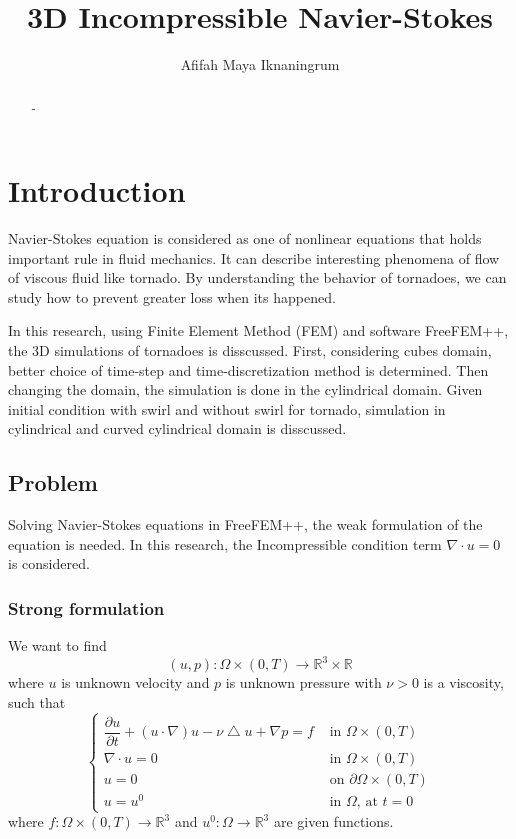 \documentclass[a4paper]{article}
\title{3D Incompressible Navier-Stokes}
\author{Afifah Maya Iknaningrum}
\newcommand{\R}{\mathbb{R}}
\begin{document}
\maketitle

\begin{abstract}
-
\end{abstract}

\section{Introduction}

Navier-Stokes equation is considered as one of nonlinear equations that holds important rule in fluid mechanics. It can describe interesting phenomena of flow of viscous fluid like tornado. By understanding the behavior of tornadoes, we can study how to prevent greater loss when its happened.

In this research, using Finite Element Method (FEM) and software FreeFEM++, the 3D simulations of tornadoes is disscussed. First, considering cubes domain, better choice of time-step and time-discretization method is determined. Then changing the domain, the simulation is done in the cylindrical domain. Given initial condition with swirl and without swirl for tornado, simulation in cylindrical and curved cylindrical domain is disscussed.

\subsection{Problem}
Solving Navier-Stokes equations in FreeFEM++, the weak formulation of the equation is needed. In this research, the Incompressible condition term $ \nabla \cdot u = 0 $ is considered.
\subsubsection{Strong formulation}
We want to find \[(u,p) : \Omega \times (0,T) \rightarrow \R^3 \times \R\] where $ u $ is unknown velocity and $ p $ is unknown pressure with $ \nu > 0 $ is a viscosity, such that
\begin{equation}\label{Navier-Stokes}
\begin{cases}
\dfrac{\partial u}{\partial t} + (u \cdot \nabla) u - \nu \bigtriangleup u + \nabla p = f & \text{ in } \Omega \times (0,T)\\
\nabla \cdot u = 0 & \text{ in } \Omega \times (0,T)\\
u = 0 & \text{ on } \partial \Omega \times (0,T)\\
u = u^0 & \text{ in } \Omega \text{, at } t=0
\end{cases}
\end{equation}
where $ f : \Omega \times (0,T) \rightarrow \R^3 $ and $ u^0 : \Omega \rightarrow \R^3 $ are given functions.
\end{document}
